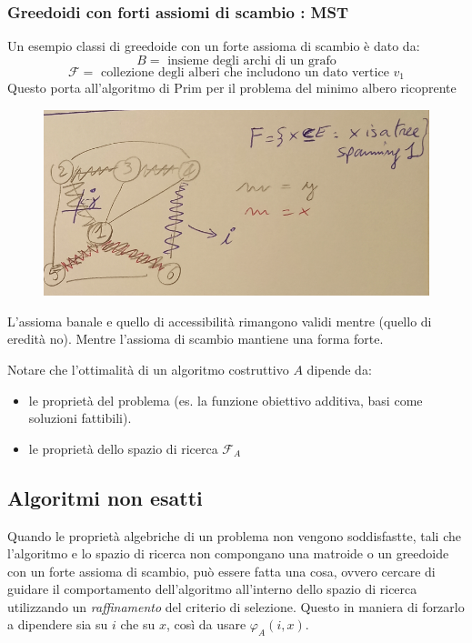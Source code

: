 \documentclass{article}
\begin{document}
\subsubsection{Greedoidi con forti assiomi di scambio : MST}
Un esempio classi di greedoide con un forte assioma di scambio è dato da:
$$B=\text{ insieme degli archi di un grafo}$$
$$\mathcal{F}=\text{ collezione degli alberi che includono un dato vertice } v_1$$
Questo porta all'algoritmo di Prim per il problema del minimo albero ricoprente
\begin{figure}[H]
    \centering
    \includegraphics[scale=0.5]{images/greedoid_mst.png}
\end{figure}
L'assioma banale e quello di accessibilità rimangono validi mentre (quello
di eredità no). Mentre l'assioma di scambio mantiene una forma forte.

Notare che l'ottimalità di un algoritmo costruttivo $A$ dipende da:
\begin{itemize}
    \item le proprietà del problema (es. la funzione obiettivo additiva, basi
          come soluzioni fattibili).
    \item le proprietà dello spazio di ricerca $\mathcal{F}_A$
\end{itemize}

\subsection{Algoritmi non esatti}

Quando le proprietà algebriche di un problema non vengono soddisfastte, tali che l'algoritmo e
lo spazio di ricerca non compongano una matroide o un greedoide con un forte assioma di scambio,
può essere fatta una cosa, ovvero cercare di guidare il comportamento dell'algoritmo all'interno dello
spazio di ricerca utilizzando un \textit{raffinamento} del criterio di selezione. Questo in maniera
di forzarlo a dipendere sia su $i$ che su $x$, così da usare $\varphi_A (i,x)$.
\end{document}
